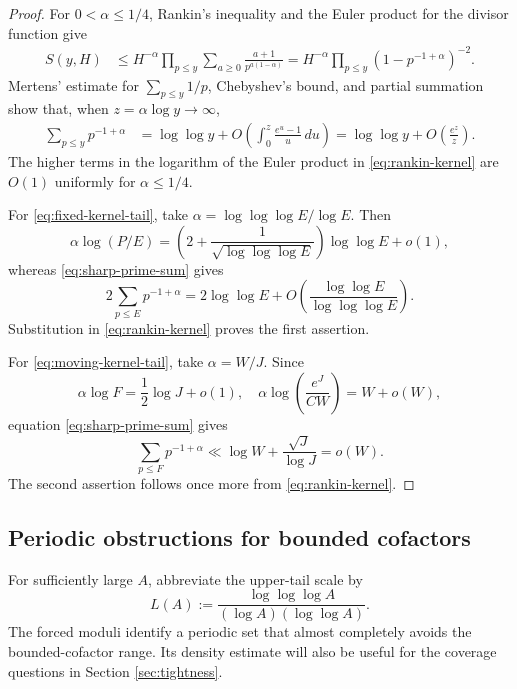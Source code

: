\documentclass[11pt,letterpaper,reqno]{amsart}
\numberwithin{equation}{section}
\theoremstyle{remark}
\newcommand{\1}{\mathbf 1}
\renewcommand{\leq}{\leqslant}
\renewcommand{\geq}{\geqslant}
\begin{document}
\begin{proof}
For $0<\alpha\leq1/4$, Rankin's inequality and the Euler product for the
divisor function give
\begin{align}
 S(y,H)
 &\leq H^{-\alpha}
 \prod_{p\leq y}\sum_{a\geq0}
 \frac{a+1}{p^{a(1-\alpha)}}
 =H^{-\alpha}
 \prod_{p\leq y}(1-p^{-1+\alpha})^{-2}.
 \label{eq:rankin-kernel}
\end{align}
Mertens' estimate for $\sum_{p\leq y}1/p$, Chebyshev's bound, and partial
summation show that, when $z=\alpha\log y\to\infty$,
\begin{align}
 \sum_{p\leq y}p^{-1+\alpha}
 &=\log\log y+
 O\left(\int_0^z\frac{e^u-1}{u}\,du\right)
 =\log\log y+O\left(\frac{e^z}{z}\right).
 \label{eq:sharp-prime-sum}
\end{align}
The higher terms in the logarithm of the Euler product in
\eqref{eq:rankin-kernel} are $O(1)$ uniformly for $\alpha\leq1/4$.

For \eqref{eq:fixed-kernel-tail}, take
$\alpha=\log\log\log E/\log E$. Then
\[
 \alpha\log(P/E)
 =\left(2+\frac1{\sqrt{\log\log\log E}}\right)\log\log E+o(1),
\]
whereas \eqref{eq:sharp-prime-sum} gives
\[
 2\sum_{p\leq E}p^{-1+\alpha}
 =2\log\log E+O\left(\frac{\log\log E}{\log\log\log E}\right).
\]
Substitution in \eqref{eq:rankin-kernel} proves the first assertion.

For \eqref{eq:moving-kernel-tail}, take $\alpha=W/J$. Since
\[
 \alpha\log F=\frac12\log J+o(1),
 \quad
 \alpha\log\left(\frac{e^J}{CW}\right)=W+o(W),
\]
equation \eqref{eq:sharp-prime-sum} gives
\[
 \sum_{p\leq F}p^{-1+\alpha}
 \ll\log W+\frac{\sqrt J}{\log J}=o(W).
\]
The second assertion follows once more from \eqref{eq:rankin-kernel}.
\end{proof}

\subsection{Periodic obstructions for bounded cofactors}

For sufficiently large $A$, abbreviate the upper-tail scale by
\[
 L(A):=\frac{\log\log\log A}{(\log A)(\log\log A)}.
\]
The forced moduli identify a periodic set that almost completely avoids
the bounded-cofactor range. Its density estimate will also be useful for
the coverage questions in Section \ref{sec:tightness}.
\end{document}

